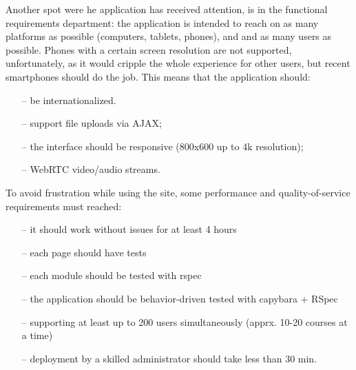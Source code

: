 Another spot were he application has received attention, is in the functional requirements department:
the application is intended to reach on as many platforms as possible (computers, tablets, phones), and and
as many users as possible. Phones with a certain screen resolution are not supported, unfortunately, as it
would cripple the whole experience for other users, but recent smartphones
should do the job. This means that the application should:
\begin{enumerate}[topsep=5pt, partopsep=0pt,itemsep=3pt,parsep=1pt]
    \item[--] be internationalized.
    \item[--] support file uploads via AJAX;
    \item[--] the interface should be responsive (800x600 up to 4k resolution);
    \item[--] WebRTC video/audio streams.
\end{enumerate}

To avoid frustration while using the site, some performance and quality-of-service requirements
must reached:
\begin{enumerate}[topsep=5pt, partopsep=0pt,itemsep=3pt,parsep=1pt]
    \item[--] it should work without issues for at least 4 hours
    \item[--] each page should have tests
    \item[--] each module should be tested with rspec
    \item[--] the application should be behavior-driven tested with capybara + RSpec
    \item[--] supporting at least up to 200 users simultaneously (apprx. 10-20 courses at a time)
    \item[--] deployment by a skilled administrator should take less than 30 min.
\end{enumerate}

